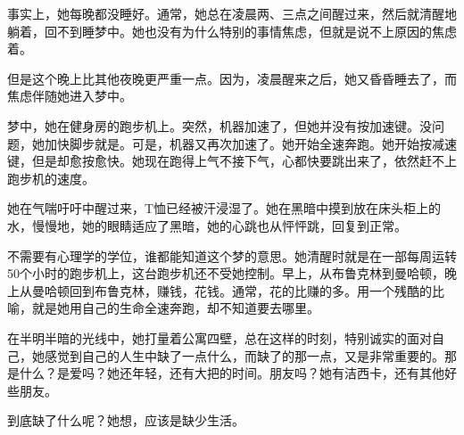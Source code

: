 事实上，她每晚都没睡好。通常，她总在凌晨两、三点之间醒过来，然后就清醒地躺着，回不到睡梦中。她也没有为什么特别的事情焦虑，但就是说不上原因的焦虑着。

但是这个晚上比其他夜晚更严重一点。因为，凌晨醒来之后，她又昏昏睡去了，而焦虑伴随她进入梦中。

梦中，她在健身房的跑步机上。突然，机器加速了，但她并没有按加速键。没问题，她加快脚步就是。可是，机器又再次加速了。她开始全速奔跑。她开始按减速键，但是却愈按愈快。她现在跑得上气不接下气，心都快要跳出来了，依然赶不上跑步机的速度。

她在气喘吁吁中醒过来，T恤已经被汗浸湿了。她在黑暗中摸到放在床头柜上的水，慢慢地，她的眼睛适应了黑暗，她的心跳也从怦怦跳，回复到正常。

不需要有心理学的学位，谁都能知道这个梦的意思。她清醒时就是在一部每周运转50个小时的跑步机上，这台跑步机还不受她控制。早上，从布鲁克林到曼哈顿，晚上从曼哈顿回到布鲁克林，赚钱，花钱。通常，花的比赚的多。用一个残酷的比喻，就是她用自己的生命全速奔跑，却不知道要去哪里。

在半明半暗的光线中，她打量着公寓四壁，总在这样的时刻，特别诚实的面对自己，她感觉到自己的人生中缺了一点什么，而缺了的那一点，又是非常重要的。那是什么？是爱吗？她还年轻，还有大把的时间。朋友吗？她有洁西卡，还有其他好些朋友。

到底缺了什么呢？她想，应该是缺少生活。
